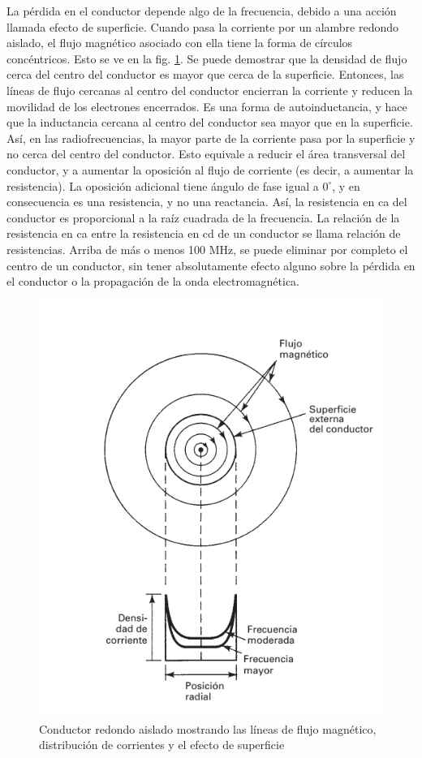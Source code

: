                 La pérdida en el conductor depende algo de la frecuencia, debido a una acción llamada efecto de superficie. Cuando pasa la corriente por un alambre redondo aislado, el flujo magnético asociado con ella tiene la forma de círculos concéntricos. Esto se ve en la fig. \ref{fig:perdidas_conductor}. Se puede demostrar que la densidad de flujo cerca del centro del conductor es mayor que cerca de la superficie. Entonces, las líneas de flujo cercanas al centro del conductor encierran la corriente y reducen la movilidad de los electrones encerrados. Es una forma de autoinductancia, y hace que la inductancia cercana al centro del conductor sea mayor que en la superficie. Así, en las radiofrecuencias, la mayor parte de la corriente pasa por la superficie y no cerca del centro del conductor. Esto equivale a reducir el área transversal del conductor, y a aumentar la oposición al flujo de corriente (es decir, a aumentar la resistencia). La oposición adicional tiene ángulo de fase igual a $0^\circ$, y en consecuencia es una resistencia, y no una reactancia. Así, la resistencia en ca del conductor es proporcional a la raíz cuadrada de la frecuencia. La relación de la resistencia en ca entre la resistencia en cd de un conductor se llama relación de resistencias. Arriba de más o menos 100 MHz, se puede eliminar por completo el centro de un conductor, sin tener absolutamente efecto alguno sobre la pérdida en el conductor o la propagación de la onda electromagnética.

                \begin{figure}[H]
                    \centering
                    \includegraphics[width=0.5\linewidth]{imagenes/perdidas_conductor.png}
                    \caption{Conductor redondo aislado mostrando las líneas de flujo magnético, distribución de corrientes y el efecto de superficie}
                    \label{fig:perdidas_conductor}
                \end{figure}

